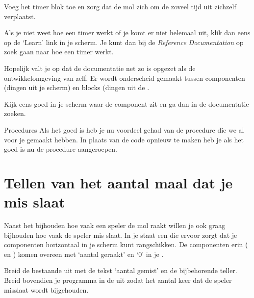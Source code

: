  
\begin{opgave}
    \opgVraag
	Voeg het timer blok toe en zorg dat de mol zich om de zoveel tijd uit zichzelf verplaatst.
\end{opgave}

Als je niet weet hoe een timer werkt of je komt er niet helemaal uit, klik dan eens op de `Learn' link in je  scherm. Je kunt dan bij de \emph{Reference Documentation} op zoek gaan naar hoe een timer werkt.

Hopelijk valt je op dat de documentatie net zo is opgezet als de ontwikkelomgeving van \ai zelf. Er wordt onderscheid gemaakt tussen componenten (dingen uit je  scherm) en blocks (dingen uit de .

Kijk eens goed in je  scherm waar de  component zit en ga dan in de documentatie zoeken.

\begin{derivation}{Procedures}
Als het goed is heb je nu voordeel gehad van de procedure die we al voor je gemaakt hebben. In plaats van de code opnieuw te maken heb je als het goed is nu de procedure aangeroepen.
\end{derivation}


\section{Tellen van het aantal maal dat je mis slaat}
Naast het bijhouden hoe vaak een speler de mol raakt willen je ook graag bijhouden hoe vaak de speler mis slaat. In je  staat een  die ervoor zorgt dat je componenten horizontaal in je scherm kunt rangschikken. De componenten erin ( en ) komen overeen met `aantal geraakt' en `0' in je .

\begin{opgave}
    \opgVraag
	Breid de bestaande  uit met de tekst `aantal gemist' en de bijbehorende teller. Breid bovendien je programma in de  uit zodat het aantal keer dat de speler misslaat wordt bijgehouden. 
\end{opgave}


